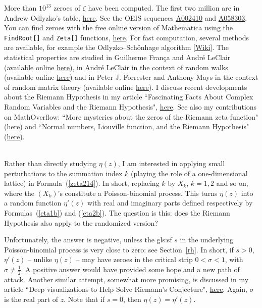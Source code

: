 \documentclass[10pt]{article}
\begin{document}
More than $10^{13}$ zeroes of $\zeta$ have been computed. The first two million are in Andrew Odlyzko's table,
\href{http://www.dtc.umn.edu/~odlyzko/zeta_tables/index.html}{here}. See the OEIS sequences
 \href{https://oeis.org/A002410}{A002410} and \href{https://oeis.org/A058303}{A058303}. You can find zeroes with the free online version of Mathematica using the \texttt{FindRoot[]} and \texttt{Zeta[]} functions, \href{https://bit.ly/3AXzAGl}{here}.
 For fast computation, several methods are available, for example
the Odlyzko–Schönhage algorithm [\href{https://bit.ly/330YLeD}{Wiki}]. The statistical properties are studied in
Guilherme França and André LeClair  \cite{rie34}
(available online \href{https://arxiv.org/abs/1307.8395}{here}),
in André LeClair   in the context of random walks \cite{rie35}
(available online \href{https://www.mdpi.com/2073-8994/13/11/2014}{here})
and in Peter J. Forrester and Anthony Mays in the context of random matrix theory \cite{may99} (available online \href{https://arxiv.org/abs/1506.06531}{here}).
I discuss recent developments about the Riemann Hypothesis in my article ``Fascinating Facts About Complex Random Variables and the Riemann Hypothesis", \href{https://www.vgranville.com/2022/02/fascinating-facts-about-complex-random.html}{here}. See also my contributions on MathOverflow: ``More mysteries about the zeros of the Riemann zeta function"
(\href{https://mathoverflow.net/questions/379650/more-mysteries-about-the-zeros-of-the-riemann-zeta-function}{here}) and
 ``Normal numbers, Liouville function, and the Riemann Hypothesis"
 (\href{https://mathoverflow.net/questions/391736/normal-numbers-liouville-function-and-the-riemann-hypothesis}{here}). \\
\quad \\

\noindent  Rather than directly studying $\eta(z)$, I am interested in applying small perturbations to the summation index $k$ (playing the role of a one-dimensional lattice) in Formula~(\ref{zeta214}). In short, replacing $k$ by $X_k$, $k=1,2$ and so on, where the $(X_k)$'s constitute a Poisson-binomial process. This turns $\eta(z)$ into a \textcolor{index}{random function}
$\eta'(z)$ with real and imaginary parts defined respectively by Formulas~(\ref{eta1b}) and (\ref{eta2b}).
The question is this:  does the Riemann Hypothesis also apply to the randomized version?

Unfortunately, the answer is negative, unless the \gls{gls:sf} $s$ in the underlying Poisson-binomial process is very close to zero: see Section~\ref{rh}.
In short, if $s>0$, $\eta'(z)$ -- unlike $\eta(z)$ --
may have zeroes in the critical strip
$0<\sigma<1$, with $\sigma\neq \frac{1}{2}$. A positive answer would have provided some hope and a new path of attack. Another similar attempt, somewhat more promising, is discussed in my
article ``Deep visualizations to Help Solve Riemann's Conjecture", \href{https://www.vgranville.com/2022/02/deep-visualizations-to-help-solve.html}{here}. Again, $\sigma$ is the real part of $z$. Note that if $s=0$, then
$\eta(z)=\eta'(z)$.
\end{document}
